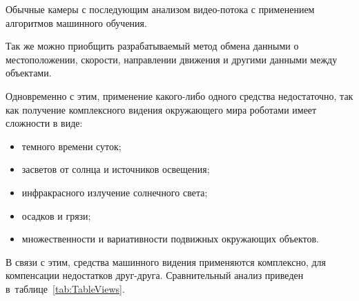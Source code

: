 Обычные камеры с последующим анализом видео-потока с применением алгоритмов машинного обучения.

Так же можно приобщить разрабатываемый метод обмена данными о местоположении, скорости, направлении движения и другими данными между объектами.

Одновременно с этим, применение какого-либо одного средства недостаточно, так как получение комплексного видения окружающего мира роботами имеет сложности в виде:

\begin{itemize}
    \item темного времени суток;
    \item засветов от солнца и источников освещения;
    \item инфракрасного излучение солнечного света;
    \item осадков и грязи;
    \item множественности и вариативности подвижных окружающих объектов.
\end{itemize}

В связи с этим, средства машинного видения применяются комплексно, для компенсации недостатков друг-друга. Сравнительный анализ приведен в~таблице~\ref{tab:TableViews}.

